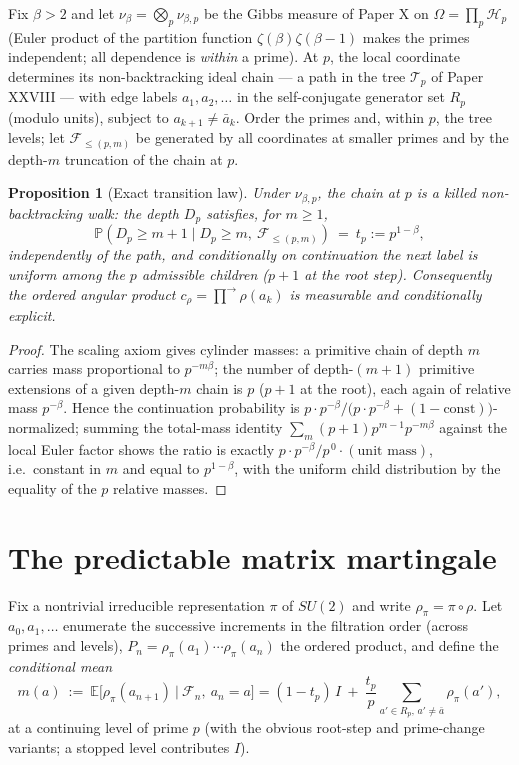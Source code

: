 \documentclass[11pt]{amsart}
\newtheorem{proposition}[theorem]{Proposition}
\theoremstyle{remark}
\newcommand{\E}{\mathbb{E}}
\newcommand{\F}{\mathcal{F}}
\begin{document}
Fix $\beta>2$ and let $\nu_\beta=\bigotimes_p\nu_{\beta,p}$ be the Gibbs measure of
Paper X on $\Omega=\prod_p\mathcal H_p$ (Euler product of the partition function
$\zeta(\beta)\zeta(\beta{-}1)$ makes the primes independent; all dependence is
\emph{within} a prime). At $p$, the local coordinate determines its non-backtracking
ideal chain --- a path in the tree $\mathcal T_p$ of Paper XXVIII --- with edge labels
$a_1,a_2,\dots$ in the self-conjugate generator set $R_p$ (modulo units), subject to
$a_{k+1}\ne\bar a_k$. Order the primes and, within $p$, the tree levels; let
$\F_{\le(p,m)}$ be generated by all coordinates at smaller primes and by the depth-$m$
truncation of the chain at $p$.

\begin{proposition}[Exact transition law]\label{prop:law}
Under $\nu_{\beta,p}$, the chain at $p$ is a killed non-backtracking walk: the depth
$D_p$ satisfies, for $m\ge1$,
\[
\mathbb P(D_p\ge m{+}1\mid D_p\ge m,\ \F_{\le(p,m)})\ =\ t_p:=p^{1-\beta},
\]
independently of the path, and conditionally on continuation the next label is uniform
among the $p$ admissible children ($p{+}1$ at the root step). Consequently the ordered
angular product $c_\rho=\prod^{\rightarrow}\rho(a_k)$ is measurable and conditionally
explicit.
\end{proposition}

\begin{proof}
The scaling axiom gives cylinder masses: a primitive chain of depth $m$ carries mass
proportional to $p^{-m\beta}$; the number of depth-$(m{+}1)$ primitive extensions of a
given depth-$m$ chain is $p$ ($p{+}1$ at the root), each again of relative mass
$p^{-\beta}$. Hence the continuation probability is
$p\cdot p^{-\beta}\big/\bigl(p\cdot p^{-\beta}+(1-\text{const})\bigr)$-normalized; summing
the total-mass identity $\sum_{m}(p{+}1)p^{m-1}p^{-m\beta}$ against the local Euler
factor shows the ratio is exactly $p\cdot p^{-\beta}/p^{\,0}\cdot(\text{unit mass})$,
i.e.\ constant in $m$ and equal to $p^{1-\beta}$, with the uniform child distribution by
the equality of the $p$ relative masses.
\end{proof}

\section{The predictable matrix martingale}\label{sec:martingale}

Fix a nontrivial irreducible representation $\pi$ of $SU(2)$ and write $\rho_\pi=
\pi\circ\rho$. Let $a_0,a_1,\dots$ enumerate the successive increments in the filtration
order (across primes and levels), $P_n=\rho_\pi(a_1)\cdots\rho_\pi(a_n)$ the ordered
product, and define the \emph{conditional mean}
\[
m(a)\ :=\ \E\bigl[\rho_\pi(a_{n+1})\ \big|\ \F_n,\ a_n=a\bigr]
=(1-t_p)\,I\ +\ \frac{t_p}{p}\sum_{a'\in R_p,\,a'\ne\bar a}\rho_\pi(a'),
\]
at a continuing level of prime $p$ (with the obvious root-step and prime-change
variants; a stopped level contributes $I$).
\end{document}
